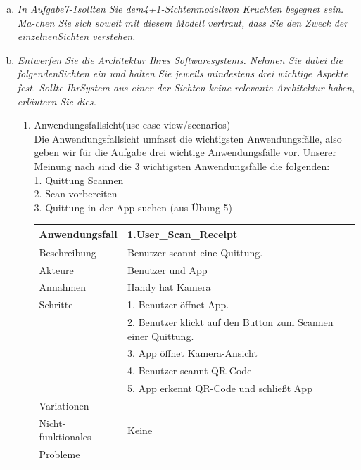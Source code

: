 \begin{enumerate}[(a)]
    \item {\itshape In Aufgabe7-1sollten Sie dem4+1-Sichtenmodellvon Kruchten begegnet sein. Ma-chen Sie sich soweit mit diesem Modell vertraut, dass Sie den Zweck der einzelnenSichten  verstehen.}
    
    \item {\itshape Entwerfen Sie die Architektur Ihres Softwaresystems. Nehmen Sie dabei die folgendenSichten ein und halten Sie jeweils mindestens drei wichtige Aspekte fest. Sollte IhrSystem aus einer der Sichten keine relevante Architektur haben, erläutern Sie dies.}

    \begin{enumerate}[1.]
        \item Anwendungsfallsicht(use-case view/scenarios) \\
        Die Anwendungsfallsicht umfasst die wichtigsten Anwendungsfälle, also geben wir für die Aufgabe drei wichtige Anwendungsfälle vor.
        Unserer Meinung nach sind die 3 wichtigsten Anwendungsfälle die folgenden:\\
        1. Quittung Scannen \\
        2. Scan vorbereiten \\
        3. Quittung in der App suchen (aus Übung 5) \\
        
         \begin{tabular}{l|l}
            Anwendungsfall &  1.User\_Scan\_Receipt \\ 
            \hline  
            Beschreibung & Benutzer scannt eine Quittung. \\
            \hline  
            Akteure & Benutzer und App \\
            \hline  
            Annahmen & Handy hat Kamera \\
            \hline  
            Schritte & 1. Benutzer öffnet App. \\
            & 2. Benutzer klickt auf den Button zum Scannen einer Quittung. \\
            & 3. App öffnet Kamera-Ansicht \\
            & 4. Benutzer scannt QR-Code \\
            & 5. App erkennt QR-Code und schließt App\\
            \hline  
            Variationen &  \\
            \hline  
            Nicht-funktionales & Keine \\
            \hline  
            Probleme &  \\
            \hline  
 

\end{tabular}
\end{enumerate}
\end{enumerate}
